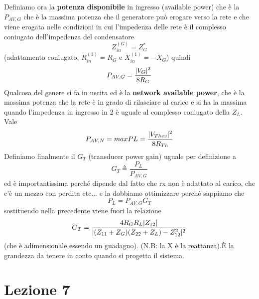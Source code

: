 \documentclass[oneside, 12pt]{extbook}
\DeclarePairedDelimiter{\abs}{\lvert}{\rvert}
\begin{document}
Definiamo ora la \textbf{potenza disponibile} in ingresso (available power) che è la $P_{AV,G}$ che è la massima potenza che il generatore può erogare verso la rete e che viene erogata nelle condizioni in cui l'impedenza delle rete è il complesso coniugato dell'impedenza del condensatore 
\begin{equation}
	Z_{in}^{(G)} = Z_G^*	
\end{equation}
(adattamento coniugato, $R_{in}^{(1)} = R_G$ e $X_{in}^{(1)} = -X_G$)
quindi 
\begin{equation}
	P_{AV,G} = \dfrac{\abs{V_G}^2}{8R_G}	
\end{equation}
Qualcosa del genere si fa in uscita ed è la \textbf{network available power}, che è la massima potenza che la rete è in grado di rilasciare al carico e si ha la massima quando l'impedenza in ingresso in 2 è uguale al complesso coniugato della $Z_L$.\\Vale 
\begin{equation}
	P_{AV,N} = max{PL} = \dfrac{\abs{V_{Thev}}^2}{8 R_{Th}}	
\end{equation}
Definiamo finalmente il $G_T$ (transducer power gain) uguale per definizione a
\begin{equation}
	G_T \triangleq \frac{P_L}{P_{AV,G}} 	
\end{equation}
ed è importantissima perché dipende dal fatto che rx non è adattato al carico, che c'è un mezzo con perdita etc... e la dobbiamo ottimizzare perché sappiamo che
\begin{equation}
	P_L = P_{AV,G} G_T	
\end{equation}
sostituendo nella precedente viene fuori la relazione
\begin{equation}
	G_T = \dfrac{4R_G R_L \abs{Z_{12}}}{\abs{ (Z_{11} + Z_G) (Z_{22} + Z_L) - Z_{12}^2}^2}
\end{equation} 
(che è adimensionale essendo un guadagno). (N.B: la X è la reattanza).È la grandezza da tenere in conto quando si progetta il sistema.


\chapter{Lezione 7}
\end{document}
